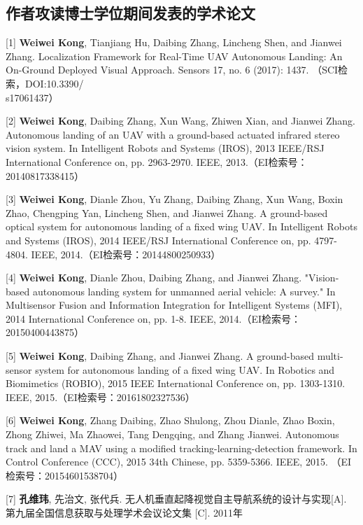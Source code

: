 \begin{resume}

\section*{作者攻读博士学位期间发表的学术论文} %

[1] \textbf{Weiwei Kong}, Tianjiang Hu, Daibing Zhang, Lincheng Shen, and Jianwei Zhang. Localization Framework for Real-Time UAV Autonomous Landing: An On-Ground Deployed Visual Approach. Sensors 17, no. 6 (2017): 1437. （SCI检索，DOI:10.3390/\\s17061437）

[2] \textbf{Weiwei Kong}, Daibing Zhang, Xun Wang, Zhiwen Xian, and Jianwei Zhang. Autonomous landing of an UAV with a ground-based actuated infrared stereo vision system. In Intelligent Robots and Systems (IROS), 2013 IEEE/RSJ International Conference on, pp. 2963-2970. IEEE, 2013.（EI检索号：20140817338415）

[3] \textbf{Weiwei Kong}, Dianle Zhou, Yu Zhang, Daibing Zhang, Xun Wang, Boxin Zhao, Chengping Yan, Lincheng Shen, and Jianwei Zhang. A ground-based optical system for autonomous landing of a fixed wing UAV. In Intelligent Robots and Systems (IROS), 2014 IEEE/RSJ International Conference on, pp. 4797-4804. IEEE, 2014.（EI检索号：20144800250933）

[4] \textbf{Weiwei Kong}, Dianle Zhou, Daibing Zhang, and Jianwei Zhang. "Vision-based autonomous landing system for unmanned aerial vehicle: A survey." In Multisensor Fusion and Information Integration for Intelligent Systems (MFI), 2014 International Conference on, pp. 1-8. IEEE, 2014.（EI检索号：20150400443875）

[5] \textbf{Weiwei Kong}, Daibing Zhang, and Jianwei Zhang. A ground-based multi-sensor system for autonomous landing of a fixed wing UAV. In Robotics and Biomimetics (ROBIO), 2015 IEEE International Conference on, pp. 1303-1310. IEEE, 2015.（EI检索号：20161802327536）

[6] \textbf{Weiwei Kong}, Zhang Daibing, Zhao Shulong, Zhou Dianle, Zhao Boxin, Zhong Zhiwei, Ma Zhaowei, Tang Dengqing, and Zhang Jianwei. Autonomous track and land a MAV using a modified tracking-learning-detection framework. In Control Conference (CCC), 2015 34th Chinese, pp. 5359-5366. IEEE, 2015. （EI检索号：20154601538704）

[7] \textbf{孔维玮}, 先治文, 张代兵. 无人机垂直起降视觉自主导航系统的设计与实现[A]. 第九届全国信息获取与处理学术会议论文集 [C]. 2011年


\end{resume}
